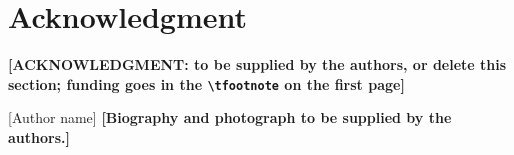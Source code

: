 \documentclass{ieeeaccess}
\begin{document}
\section*{Acknowledgment}
\textbf{[ACKNOWLEDGMENT: to be supplied by the authors, or delete this section; funding goes in the
\texttt{\textbackslash tfootnote} on the first page]}




\begin{IEEEbiographynophoto}{[Author name]}
\textbf{[Biography and photograph to be supplied by the authors.]}
\end{IEEEbiographynophoto}

\EOD
\end{document}
